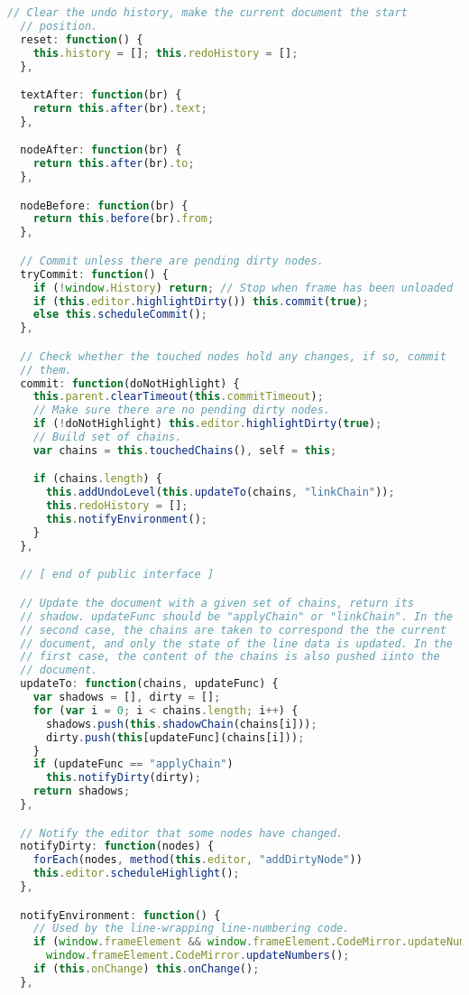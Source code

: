 \begin{lstlisting}[language=Javascript]
  // Clear the undo history, make the current document the start
  // position.
  reset: function() {
    this.history = []; this.redoHistory = [];
  },

  textAfter: function(br) {
    return this.after(br).text;
  },

  nodeAfter: function(br) {
    return this.after(br).to;
  },

  nodeBefore: function(br) {
    return this.before(br).from;
  },

  // Commit unless there are pending dirty nodes.
  tryCommit: function() {
    if (!window.History) return; // Stop when frame has been unloaded
    if (this.editor.highlightDirty()) this.commit(true);
    else this.scheduleCommit();
  },

  // Check whether the touched nodes hold any changes, if so, commit
  // them.
  commit: function(doNotHighlight) {
    this.parent.clearTimeout(this.commitTimeout);
    // Make sure there are no pending dirty nodes.
    if (!doNotHighlight) this.editor.highlightDirty(true);
    // Build set of chains.
    var chains = this.touchedChains(), self = this;

    if (chains.length) {
      this.addUndoLevel(this.updateTo(chains, "linkChain"));
      this.redoHistory = [];
      this.notifyEnvironment();
    }
  },

  // [ end of public interface ]

  // Update the document with a given set of chains, return its
  // shadow. updateFunc should be "applyChain" or "linkChain". In the
  // second case, the chains are taken to correspond the the current
  // document, and only the state of the line data is updated. In the
  // first case, the content of the chains is also pushed iinto the
  // document.
  updateTo: function(chains, updateFunc) {
    var shadows = [], dirty = [];
    for (var i = 0; i < chains.length; i++) {
      shadows.push(this.shadowChain(chains[i]));
      dirty.push(this[updateFunc](chains[i]));
    }
    if (updateFunc == "applyChain")
      this.notifyDirty(dirty);
    return shadows;
  },

  // Notify the editor that some nodes have changed.
  notifyDirty: function(nodes) {
    forEach(nodes, method(this.editor, "addDirtyNode"))
    this.editor.scheduleHighlight();
  },

  notifyEnvironment: function() {
    // Used by the line-wrapping line-numbering code.
    if (window.frameElement && window.frameElement.CodeMirror.updateNumbers)
      window.frameElement.CodeMirror.updateNumbers();
    if (this.onChange) this.onChange();
  },


\end{lstlisting}
